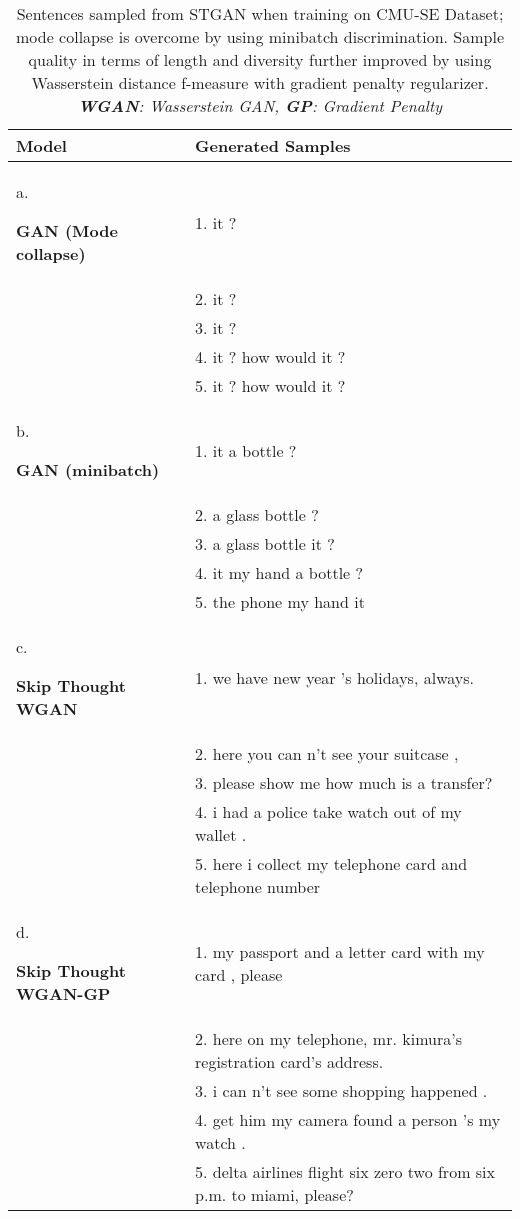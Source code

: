 \documentclass[11pt,a4paper]{article}
\begin{document}
\begin{table*}[t!]
\begin{center}
\small
\begin{tabular}{ l|l } 
\hline
\textbf{\hfill Model \hfill} & \textbf{Generated Samples}\\
\hline
{\begin{small}a. \end{small}\textbf{GAN (Mode collapse)}} 
& 1. it ? \\
& 2. it ? \\
& 3. it ? \\
& 4. it ? how would it ? \\
& 5. it ? how would it ? \\ 
\hline
{\begin{small}b. \end{small}\textbf{GAN (minibatch)}} 
& 1. it a bottle ? \\
& 2. a glass bottle ? \\
& 3. a glass bottle it ? \\
& 4. it my hand a bottle ? \\
& 5. the phone my hand it \\
\hline
{\begin{small}c. \end{small}\textbf{Skip Thought WGAN}}
& 1. we have new year ’s holidays, always. \\
& 2. here you can n’t see your suitcase , \\
& 3. please show me how much is a transfer? \\
& 4. i had a police take watch out of my wallet . \\
& 5. here i collect my telephone card and telephone number \\
\hline
{\begin{small}d. \end{small}\textbf{Skip Thought WGAN-GP}}
& 1. my passport and a letter card with my card , please \\
& 2. here on my telephone, mr. kimura’s registration card’s address. \\
& 3. i can n’t see some shopping happened . \\
& 4. get him my camera found a person ’s my watch . \\
& 5. delta airlines flight six zero two from six p.m. to miami, please? \\
\hline
\end{tabular}
\caption{\label{table:2}Sentences sampled from STGAN when training on CMU-SE Dataset;
mode collapse is overcome by using minibatch discrimination. Sample quality in terms of length and diversity further improved by using Wasserstein distance f-measure with gradient penalty regularizer.  \textit{\textbf{WGAN}: Wasserstein GAN,  \textbf{GP}: Gradient Penalty}}
\end{center}
\end{table*}
\end{document}
